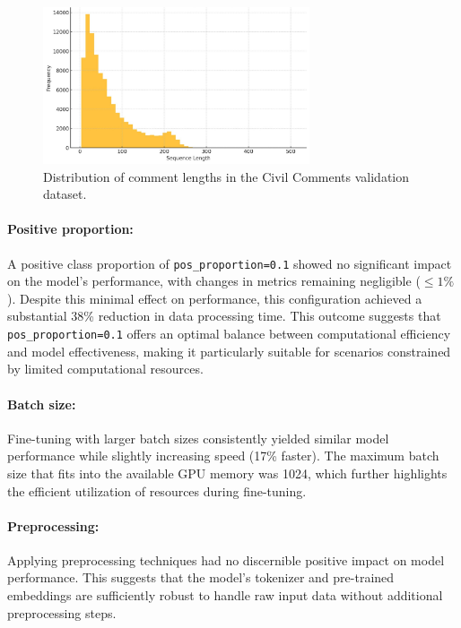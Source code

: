 \begin{figure}[ht]
    \centering
    \includegraphics[width=0.7\textwidth]{./figures/seq_len.jpg}
    \caption{Distribution of comment lengths in the Civil Comments validation dataset.}
    \label{fig:seq_len}
\end{figure}

\paragraph{Positive proportion:} A positive class proportion of \texttt{pos\_proportion=0.1} showed no significant impact on the model's performance, with changes in metrics remaining negligible (\(\leq 1\%\)). Despite this minimal effect on performance, this configuration achieved a substantial 38\% reduction in data processing time. This outcome suggests that \texttt{pos\_proportion=0.1} offers an optimal balance between computational efficiency and model effectiveness, making it particularly suitable for scenarios constrained by limited computational resources.

\paragraph{Batch size:} Fine-tuning with larger batch sizes consistently yielded similar model performance while slightly increasing speed (17\% faster). The maximum batch size that fits into the available GPU memory was 1024, which further highlights the efficient utilization of resources during fine-tuning.

\paragraph{Preprocessing:} Applying preprocessing techniques had no discernible positive impact on model performance. This suggests that the model's tokenizer and pre-trained embeddings are sufficiently robust to handle raw input data without additional preprocessing steps.

